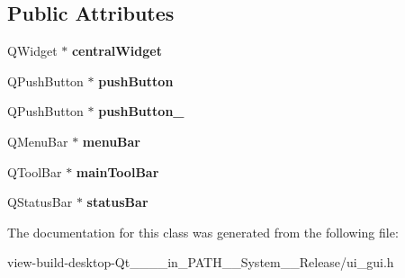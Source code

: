 \subsection*{Public Attributes}
\begin{DoxyCompactItemize}
\item 
\hypertarget{classUi__FST_a555b9679423f6e8eff8cb8dc6beb6317}{Q\-Widget $\ast$ {\bfseries central\-Widget}}\label{classUi__FST_a555b9679423f6e8eff8cb8dc6beb6317}

\item 
\hypertarget{classUi__FST_a914265400101ad99e9b4fc4ed839aeca}{Q\-Push\-Button $\ast$ {\bfseries push\-Button}}\label{classUi__FST_a914265400101ad99e9b4fc4ed839aeca}

\item 
\hypertarget{classUi__FST_ab41644a6d2eda1602c2d1251df8d07f4}{Q\-Push\-Button $\ast$ {\bfseries push\-Button\-\_}}\label{classUi__FST_ab41644a6d2eda1602c2d1251df8d07f4}

\item 
\hypertarget{classUi__FST_a715dc0f9ac0072b284ae630a2ad14eeb}{Q\-Menu\-Bar $\ast$ {\bfseries menu\-Bar}}\label{classUi__FST_a715dc0f9ac0072b284ae630a2ad14eeb}

\item 
\hypertarget{classUi__FST_a2d6f774bbc561a4a21c4ec23cbff2aa6}{Q\-Tool\-Bar $\ast$ {\bfseries main\-Tool\-Bar}}\label{classUi__FST_a2d6f774bbc561a4a21c4ec23cbff2aa6}

\item 
\hypertarget{classUi__FST_a026d86e89eea21c85f37df4e3d6ffec2}{Q\-Status\-Bar $\ast$ {\bfseries status\-Bar}}\label{classUi__FST_a026d86e89eea21c85f37df4e3d6ffec2}

\end{DoxyCompactItemize}


The documentation for this class was generated from the following file\-:\begin{DoxyCompactItemize}
\item 
view-\/build-\/desktop-\/\-Qt\-\_\-\_\-\_\-\_\-in\-\_\-\-P\-A\-T\-H\-\_\-\-\_\-\-System\-\_\-\-\_\-\-Release/ui\-\_\-gui.\-h\end{DoxyCompactItemize}
